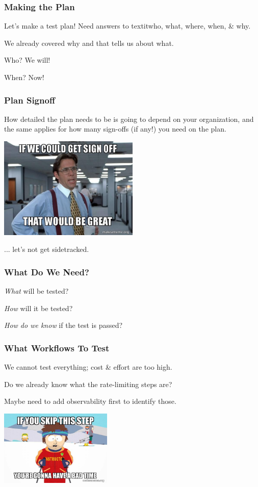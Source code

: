 \begin{frame}
\frametitle{Making the Plan}

Let's make a test plan! Need answers to textit{who, what, where, when, \& why}.

We already covered why and that tells us about what.

Who? We will!

When? Now!

\end{frame}

\begin{frame}
\frametitle{Plan Signoff}

How detailed the plan needs to be is going to depend on your organization, and the same applies for how many sign-offs (if any!) you need on the plan. 

\begin{center}
  \includegraphics[width=0.5\textwidth]{images/signoff.jpg}
\end{center}

... let's not get sidetracked.

\end{frame}


\begin{frame}
\frametitle{What Do We Need?}

\textit{What} will be tested?


\textit{How} will it be tested?


\textit{How do we know} if the test is passed?

\end{frame}

\begin{frame}
\frametitle{What Workflows To Test}

We cannot test everything; cost \& effort are too high.

Do we already know what the rate-limiting steps are?

Maybe need to add observability first to identify those.

\begin{center}
  \includegraphics[width=0.4\textwidth]{images/badtime.jpg}
\end{center}

\end{frame}

